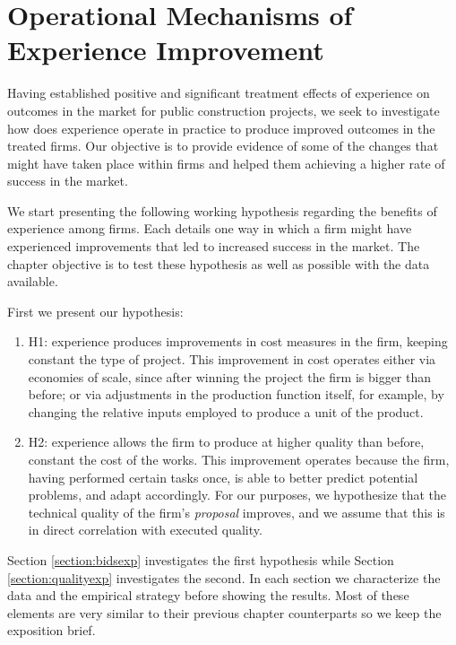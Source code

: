 \chapter{Operational Mechanisms of Experience Improvement}
Having established positive and significant treatment effects of  experience on outcomes in the market for public construction projects, we seek to investigate how does experience operate in practice to produce improved outcomes in the treated firms. Our objective is to provide evidence of some of the changes that might have taken place within firms and helped them achieving a higher rate of success in the market.

We start presenting the following working hypothesis regarding the benefits of experience among firms. Each details one way in which a firm might have experienced improvements that led to increased success in the market. The chapter objective is to test these hypothesis as well as possible with the data available.

First we present our hypothesis:
\begin{enumerate}
  \item{H1}: experience produces improvements in cost measures in the firm, keeping constant the type of project. This improvement in cost operates either via economies of scale, since after winning the project the firm is bigger than before; or via adjustments in the production function itself, for example, by changing the relative inputs employed to produce a unit of the product.
  \item{H2}: experience allows the firm to produce at higher quality than before, constant the cost of the works. This improvement operates because the firm, having performed certain tasks once, is able to better predict potential problems, and adapt accordingly. For our purposes, we hypothesize that the technical quality of the firm's \textit{proposal} improves, and we assume that this is in direct correlation with executed quality.
\end{enumerate}

Section \ref{section:bidsexp} investigates the first hypothesis while Section \ref{section:qualityexp} investigates the second. In each section we characterize the data and the empirical strategy before showing the results. Most of these elements are very similar to their previous chapter counterparts so we keep the exposition brief.

